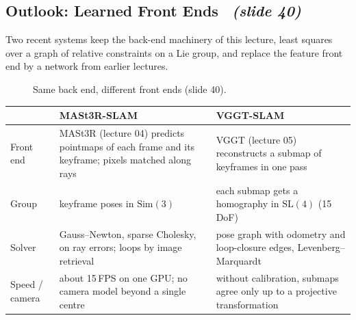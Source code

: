 \documentclass[11pt,a4paper]{article}
\newcommand{\slrs}[1]{\texorpdfstring{\ \emph{(slide #1)}}{ (slide #1)}}
\newcommand{\Sim}{\mathrm{Sim}(3)}
\newcommand{\SL}{\mathrm{SL}(4)}
\begin{document}
\subsection{Outlook: Learned Front Ends \slrs{40}}
Two recent systems keep the back-end machinery of this lecture, least squares over a graph of relative constraints on a Lie group, and replace the feature front end by a network from earlier lectures.
\begin{figure}[htbp]\centering
{}
\caption{Same back end, different front ends (slide 40).}
\end{figure}
\begin{center}\small
\begin{tabular}{p{2.6cm}p{6.2cm}p{5.4cm}}
\toprule
 & \textbf{MASt3R-SLAM} & \textbf{VGGT-SLAM}\\\midrule
Front end & MASt3R (lecture 04) predicts pointmaps of each frame and its keyframe; pixels matched along rays & VGGT (lecture 05) reconstructs a submap of keyframes in one pass\\
Group & keyframe poses in $\Sim$ & each submap gets a homography in $\SL$ (15\,DoF)\\
Solver & Gauss--Newton, sparse Cholesky, on ray errors; loops by image retrieval & pose graph with odometry and loop-closure edges, Levenberg--Marquardt\\
Speed / camera & about 15\,FPS on one GPU; no camera model beyond a single centre & without calibration, submaps agree only up to a projective transformation\\\bottomrule
\end{tabular}
\end{center}
\end{document}
